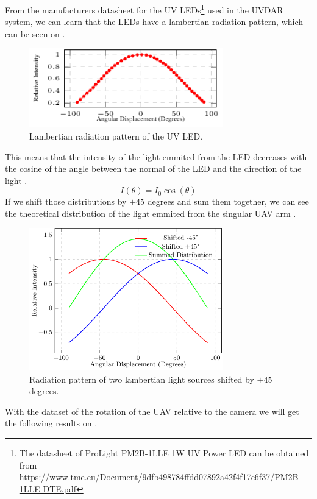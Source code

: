 From the manufacturers datasheet for the UV LEDs\footnote{The datasheet of ProLight PM2B-1LLE 1W UV Power LED can be obtained from \url{https://www.tme.eu/Document/9dfb498784ffdd07892a42f4f17c6f37/PM2B-1LLE-DTE.pdf}}
used in the UVDAR system, we can learn that the LEDs have a lambertian radiation pattern,
which can be seen on .
\begin {figure}[htbp]
	\centering
	\includegraphics[width=0.75\textwidth]{./fig/plots/lambertian/lambertian.pdf}
	\caption{Lambertian radiation pattern of the UV LED.}
	\label{fig:lambertian}
\end{figure}

This means that the intensity of the light emmited from the LED decreases with the cosine
of the angle between the normal of the LED and the direction of the light .
\begin{equation}
	I(\theta) = I_0\cos(\theta)
	\label{eq:lambertian}
\end{equation}
If we shift those distributions by $\pm 45$ degrees and sum them together, we can see the
theoretical distribution of the light emmited from the singular UAV arm .
\begin {figure}[htbp]
	\centering
	\includegraphics[width=0.75\textwidth]{./fig/plots/lambertian/3lambertian.pdf}
	\caption{Radiation pattern of two lambertian light sources shifted by $\pm 45$ degrees.}
	\label{fig:lambert_combined}
\end{figure}
With the dataset of the rotation of the UAV relative to the camera we will get the following results
on .

